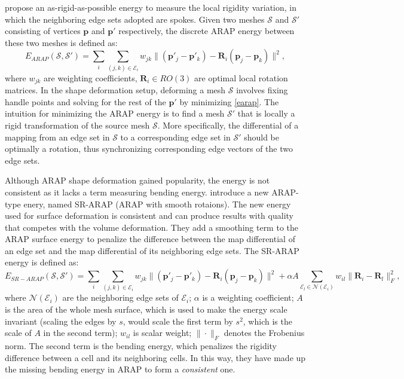 \cite{sorkine2007rigid} propose an as-rigid-as-possible energy to measure the local rigidity variation, in which the neighboring edge sets adopted are spokes. Given two meshes $\mathcal S$ and $\mathcal S'$ consisting of vertices $\mathbf{p}$ and $\mathbf{p'}$ respectively, the discrete ARAP energy between these two meshes is defined as:
\begin{equation}\label{earap}
E_{ARAP}(\mathcal S, \mathcal S')=\displaystyle \sum_i\!\!\sum_{(j,k)\in\mathcal{E}_i}\!\!\!w_{jk}\|(\mathbf p'_j - \mathbf p'_k)\!-\!\mathbf R_i(\mathbf p_j - \mathbf p_k)\|^2,
\end{equation}
where $w_{jk}$ are weighting coefficients, $\mathbf R_i \in RO(3)$ are optimal local rotation matrices. In the shape deformation setup, deforming a mesh $\mathcal S$ involves fixing handle points and solving for the rest of the $\mathbf{p'}$ by minimizing \eqref{earap}. The intuition for minimizing the ARAP energy is to find a mesh $\mathcal S'$ that is locally a rigid transformation of the source mesh $\mathcal S$. More specifically, the differential of a mapping from an edge set in $\mathcal S$ to a corresponding edge set in $\mathcal S'$ should be optimally a rotation, thus synchronizing corresponding edge vectors of the two edge sets.

Although ARAP shape deformation gained popularity, the energy is not consistent as it lacks a term measuring bending energy. \cite{levi2015smooth} introduce a new ARAP-type enery, named SR-ARAP (ARAP with smooth rotaions). The new energy used for surface deformation is consistent and can produce results with quality that competes with the volume deformation. They add a smoothing term to the ARAP surface energy to penalize the difference between the map differential of an edge set and the map differential of its neighboring edge sets. The SR-ARAP energy is defined as:
\begin{equation}\label{esrarap}
E_{\!S\!R\!-\!A\!R\!A\!P\!}(\mathcal S, \mathcal S')=\displaystyle \sum_i\!\!\sum_{(j,k)\in\mathcal{E}_i}\!\!\!w_{jk}\|(\mathbf p'_j - \mathbf p'_k)\!-\!\mathbf R_i(\mathbf p_j - \mathbf p_k)\|^2 + \alpha A\!\!\!\!\sum_{\mathcal{E}_l \in \mathcal{N}(\mathcal{E}_i)}\!\!\!\!\!\!w_{il}\|\mathbf R_i-\mathbf R_l\|_F^2 ,
\end{equation}
where $\mathcal{N}(\mathcal{E}_i)$ are the neighboring edge sets of $\mathcal{E}_i$;  $\alpha$ is a weighting coefficient; $A$ is the area of the whole mesh surface, which is used to make the energy scale invariant (scaling the edges by $s$, would scale the first term by $s^2$, which is the scale of $A$ in the second term); $w_{il}$ is scalar weight; $\|\cdot\|_F$ denotes the Frobenius norm. The second term is the bending energy, which penalizes the rigidity difference between a cell and its neighboring cells. In this way, they have made up the missing bending energy in ARAP to form a \emph{consistent} one.

